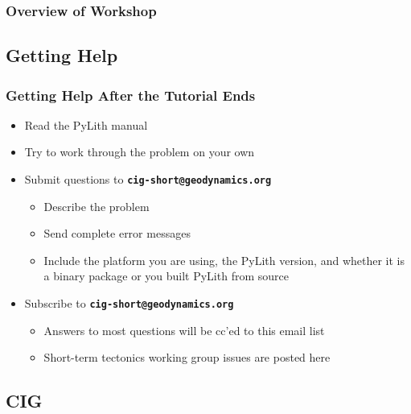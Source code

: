 \documentclass{beamer}
\newcommand{\important}[1]{{\bf\color{red}#1}}
\begin{document}
\begin{frame}
  \frametitle{Overview of Workshop}
  
  

\end{frame}


\subsection{Getting Help}

\begin{frame}
  \frametitle{Getting Help After the Tutorial Ends}
  \summary{}
 
  \begin{itemize}
  \item Read the PyLith manual
  \item Try to work through the problem on your own
  \item Submit questions to \important{\tt cig-short@geodynamics.org}
    \begin{itemize}
    \item Describe the problem
    \item Send complete error messages
    \item Include the platform you are using, the PyLith version, and
      whether it is a binary package or you built PyLith from source
   \end{itemize}
  \item Subscribe to \important{\tt cig-short@geodynamics.org}
    \begin{itemize}
    \item Answers to most questions will be cc'ed to this email list
    \item Short-term tectonics working group issues are posted here
    \end{itemize}
  \end{itemize}

\end{frame}

\subsection{CIG}
\end{document}
